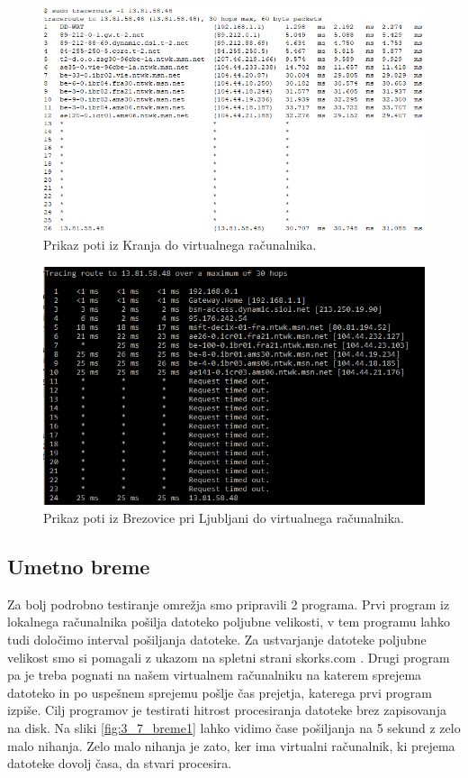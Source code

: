 \begin{figure}[H]
    \centering
    \includegraphics[scale=0.45]{Img/3_traceroute1.png}
    \caption{Prikaz poti iz Kranja do virtualnega računalnika.}
    \label{fig:3_6_traceroute1}
\end{figure}

\begin{figure}[H]
    \centering
    \includegraphics[scale=0.5]{Img/3_traceroute2.png}
    \caption{Prikaz poti iz Brezovice pri Ljubljani do virtualnega računalnika.}
    \label{fig:3_6_traceroute2}
\end{figure}


\subsection{Umetno breme}

Za bolj podrobno testiranje omrežja smo pripravili 2 programa. Prvi program iz lokalnega računalnika pošilja datoteko poljubne velikosti, v tem programu lahko tudi določimo interval pošiljanja datoteke. Za ustvarjanje datoteke poljubne velikost smo si pomagali z ukazom na spletni strani skorks.com \cite{skorks}. Drugi program pa je treba pognati na našem virtualnem računalniku na katerem sprejema datoteko in po uspešnem sprejemu pošlje čas prejetja, katerega prvi program izpiše.
Cilj programov je testirati hitrost procesiranja datoteke brez zapisovanja na disk.
Na sliki \ref{fig:3_7_breme1} lahko vidimo čase pošiljanja na 5 sekund z zelo malo nihanja. Zelo malo nihanja je zato, ker ima virtualni računalnik, ki prejema datoteke dovolj časa, da stvari procesira. 

